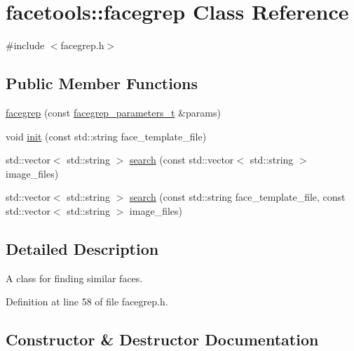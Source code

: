 \hypertarget{classfacetools_1_1facegrep}{}\section{facetools\+:\+:facegrep Class Reference}
\label{classfacetools_1_1facegrep}


{\ttfamily \#include $<$facegrep.\+h$>$}

\subsection*{Public Member Functions}
\begin{DoxyCompactItemize}
\item 
\hyperlink{classfacetools_1_1facegrep_a5a0ae090817ec1dff2d83cdb24c6dbe7}{facegrep} (const \hyperlink{structfacetools_1_1facegrep__parameters__t}{facegrep\+\_\+parameters\+\_\+t} \&params)
\item 
void \hyperlink{classfacetools_1_1facegrep_a9f7446ad35f951870378c3c53240303e}{init} (const std\+::string face\+\_\+template\+\_\+file)
\item 
std\+::vector$<$ std\+::string $>$ \hyperlink{classfacetools_1_1facegrep_a2ce6ed3683d7f53dfa8f1111c338d89d}{search} (const std\+::vector$<$ std\+::string $>$ image\+\_\+files)
\item 
std\+::vector$<$ std\+::string $>$ \hyperlink{classfacetools_1_1facegrep_a287ef659e9f0293cdd7f2a9f77eeabf1}{search} (const std\+::string face\+\_\+template\+\_\+file, const std\+::vector$<$ std\+::string $>$ image\+\_\+files)
\end{DoxyCompactItemize}


\subsection{Detailed Description}
A class for finding similar faces. 

Definition at line 58 of file facegrep.\+h.



\subsection{Constructor \& Destructor Documentation}
